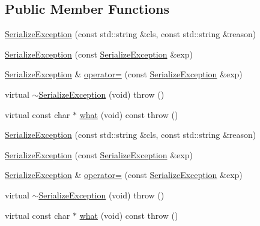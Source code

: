 \subsection*{Public Member Functions}
\begin{DoxyCompactItemize}
\item 
\mbox{\hyperlink{classFILEDB_1_1SerializeException_aab805dbcb5d495f039ec743780e5e1a2}{Serialize\+Exception}} (const std\+::string \&cls, const std\+::string \&reason)
\item 
\mbox{\hyperlink{classFILEDB_1_1SerializeException_a4583fae246a4b2d2f468c3a4ec0ecb08}{Serialize\+Exception}} (const \mbox{\hyperlink{classFILEDB_1_1SerializeException}{Serialize\+Exception}} \&exp)
\item 
\mbox{\hyperlink{classFILEDB_1_1SerializeException}{Serialize\+Exception}} \& \mbox{\hyperlink{classFILEDB_1_1SerializeException_a0333bfcab2cc76905ff3507f84148051}{operator=}} (const \mbox{\hyperlink{classFILEDB_1_1SerializeException}{Serialize\+Exception}} \&exp)
\item 
virtual \mbox{\hyperlink{classFILEDB_1_1SerializeException_abd759712a4380483f2ff4f69e1159889}{$\sim$\+Serialize\+Exception}} (void)  throw ()
\item 
virtual const char $\ast$ \mbox{\hyperlink{classFILEDB_1_1SerializeException_a71ecca567a36c3b247d936b5e98e4707}{what}} (void) const  throw ()
\item 
\mbox{\hyperlink{classFILEDB_1_1SerializeException_aab805dbcb5d495f039ec743780e5e1a2}{Serialize\+Exception}} (const std\+::string \&cls, const std\+::string \&reason)
\item 
\mbox{\hyperlink{classFILEDB_1_1SerializeException_a4583fae246a4b2d2f468c3a4ec0ecb08}{Serialize\+Exception}} (const \mbox{\hyperlink{classFILEDB_1_1SerializeException}{Serialize\+Exception}} \&exp)
\item 
\mbox{\hyperlink{classFILEDB_1_1SerializeException}{Serialize\+Exception}} \& \mbox{\hyperlink{classFILEDB_1_1SerializeException_a6ec9d7b0679c5752e900d30b92015302}{operator=}} (const \mbox{\hyperlink{classFILEDB_1_1SerializeException}{Serialize\+Exception}} \&exp)
\item 
virtual \mbox{\hyperlink{classFILEDB_1_1SerializeException_ace236a2abdc486c44c695fbdc209923a}{$\sim$\+Serialize\+Exception}} (void)  throw ()
\item 
virtual const char $\ast$ \mbox{\hyperlink{classFILEDB_1_1SerializeException_a1c143c27480a4c2d85f20a19b3061add}{what}} (void) const  throw ()
\item 

\end{DoxyCompactItemize}
